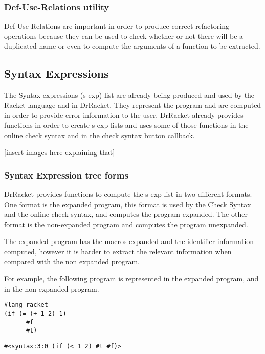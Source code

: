 \subsubsection{Def-Use-Relations utility}
Def-Use-Relations are important in order to produce correct refactoring operations
because they can be used to check whether or not there will be a duplicated name
or even to compute the arguments of a function to be extracted.


\subsection{Syntax Expressions}
The Syntax expressions (s-exp) list are already being produced and used by the
Racket language and in DrRacket. They represent the program and are computed in
order to provide error information to the user.
DrRacket already provides functions in order to create s-exp lists and uses some of those
functions in the online check syntax and in the check syntax button callback.

[insert images here explaining that]


\subsubsection{Syntax Expression tree forms}
DrRacket provides functions to compute the s-exp list in two different formats.
One format is the expanded program, this format is used by the Check Syntax and
the online check syntax, and computes the program expanded.
The other format is the non-expanded program and computes the program unexpanded.

The expanded program has the macros expanded and the identifier information computed,
however it is harder to extract the relevant information when compared with the
non expanded program.

For example, the following program is represented in the expanded program,
and in the non expanded program.
\begin{lstlisting}[basicstyle=\ttfamily, caption="example"]
#lang racket
(if (= (+ 1 2) 1)
      #f
      #t)
\end{lstlisting}

\begin{lstlisting}[basicstyle=\ttfamily, caption="Syntax from Example"]
#<syntax:3:0 (if (< 1 2) #t #f)>
\end{lstlisting}

